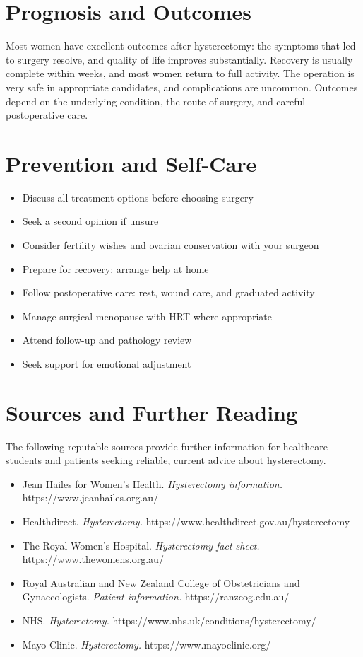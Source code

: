 \section*{Prognosis and Outcomes}
Most women have excellent outcomes after hysterectomy: the symptoms that led to surgery resolve, and quality of life improves substantially. Recovery is usually complete within weeks, and most women return to full activity. The operation is very safe in appropriate candidates, and complications are uncommon. Outcomes depend on the underlying condition, the route of surgery, and careful postoperative care.

\section*{Prevention and Self-Care}
\begin{itemize}
    \item Discuss all treatment options before choosing surgery
    \item Seek a second opinion if unsure
    \item Consider fertility wishes and ovarian conservation with your surgeon
    \item Prepare for recovery: arrange help at home
    \item Follow postoperative care: rest, wound care, and graduated activity
    \item Manage surgical menopause with HRT where appropriate
    \item Attend follow-up and pathology review
    \item Seek support for emotional adjustment
\end{itemize}

\section*{Sources and Further Reading}
The following reputable sources provide further information for healthcare students and patients seeking reliable, current advice about hysterectomy.

\begin{itemize}
    \item Jean Hailes for Women's Health. \textit{Hysterectomy information.} https://www.jeanhailes.org.au/
    \item Healthdirect. \textit{Hysterectomy.} https://www.healthdirect.gov.au/hysterectomy
    \item The Royal Women's Hospital. \textit{Hysterectomy fact sheet.} https://www.thewomens.org.au/
    \item Royal Australian and New Zealand College of Obstetricians and Gynaecologists. \textit{Patient information.} https://ranzcog.edu.au/
    \item NHS. \textit{Hysterectomy.} https://www.nhs.uk/conditions/hysterectomy/
    \item Mayo Clinic. \textit{Hysterectomy.} https://www.mayoclinic.org/
\end{itemize}

